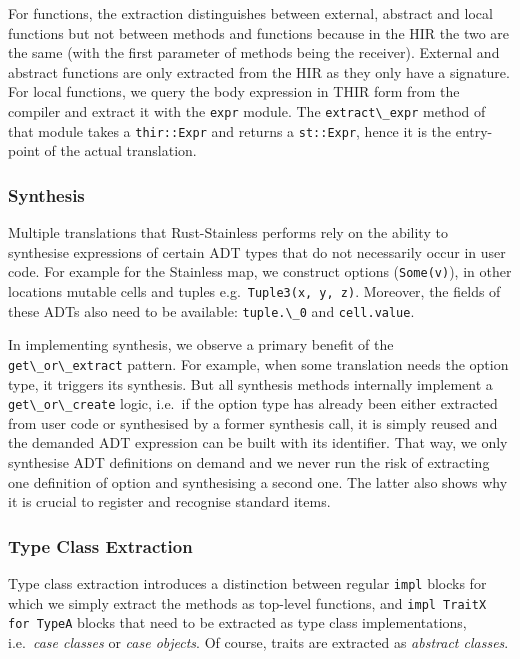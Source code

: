 For functions, the extraction distinguishes between external, abstract
and local functions but not between methods and functions because in the
HIR the two are the same (with the first parameter of methods being the
receiver). External and abstract functions are only extracted from the
HIR as they only have a signature. For local functions, we query the
body expression in THIR form from the compiler and extract it with the
\passthrough{\lstinline!expr!} module. The
\passthrough{\lstinline!extract\_expr!} method of that module takes a
\passthrough{\lstinline!thir::Expr!} and returns a
\passthrough{\lstinline!st::Expr!}, hence it is the entry-point of the
actual translation.

\subsubsection{Synthesis}

Multiple translations that Rust-Stainless performs rely on the ability
to synthesise expressions of certain ADT types that do not necessarily
occur in user code. For example for the Stainless map, we construct
options (\passthrough{\lstinline!Some(v)!}), in other locations mutable
cells and tuples e.g.~\passthrough{\lstinline!Tuple3(x, y, z)!}.
Moreover, the fields of these ADTs also need to be available:
\passthrough{\lstinline!tuple.\_0!} and
\passthrough{\lstinline!cell.value!}.

In implementing synthesis, we observe a primary benefit of the
\passthrough{\lstinline!get\_or\_extract!} pattern. For example, when
some translation needs the option type, it triggers its synthesis.
But all synthesis methods internally implement a
\passthrough{\lstinline!get\_or\_create!} logic, i.e.~if the option type
has already been either extracted from user code or synthesised by a
former synthesis call, it is simply reused and the demanded ADT
expression can be built with its identifier. That way, we only
synthesise ADT definitions on demand and we never run the risk of
extracting one definition of option and synthesising a second one. The
latter also shows why it is crucial to register and recognise standard
items.

\subsubsection{Type Class Extraction}

Type class extraction introduces a distinction between regular
\passthrough{\lstinline!impl!} blocks for which we simply extract the
methods as top-level functions, and
\passthrough{\lstinline!impl TraitX for TypeA!} blocks that need to be
extracted as type class implementations, i.e.~\emph{case classes} or
\emph{case objects}. Of course, traits are extracted as \emph{abstract
classes}.

